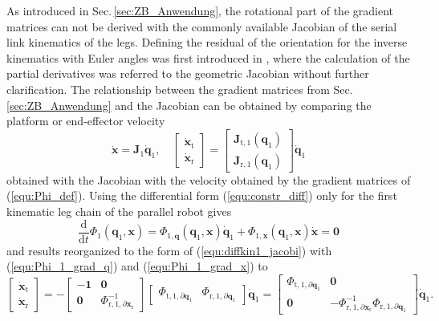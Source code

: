\documentclass[robotics,article,submit,moreauthors,pdftex]{Definitions/mdpi}
\newcommand{\bm}[1]{\boldsymbol{#1}}
\let\Phi\varPhi
\begin{document}
As introduced in Sec.\,\ref{sec:ZB_Anwendung}, the rotational part of the gradient matrices can not be derived with the commonly available Jacobian of the serial link kinematics of the legs.
Defining the residual of the orientation for the inverse kinematics with Euler angles was first introduced in \cite{GoldenbergBenFen1985}, where the calculation of the partial derivatives was referred to the geometric Jacobian without further clarification.
The relationship between the gradient matrices from Sec.\,\ref{sec:ZB_Anwendung} and the Jacobian can be obtained by comparing the platform or end-effector velocity 
%
\begin{equation}
\dot{\bm{x}} = \bm{J}_1 \dot{\bm{q}}_1,
\quad
\begin{bmatrix}
\dot{\bm{x}}_\mathrm{t}\\
\dot{\bm{x}}_\mathrm{r}
\end{bmatrix}
 = 
\begin{bmatrix}
 \bm{J}_{\mathrm{t},1}(\bm{q}_1)\\
 \bm{J}_{\mathrm{r},1}(\bm{q}_1) 
\end{bmatrix}
\dot{\bm{q}}_1
\label{equ:diffkin1_jacobi}
\end{equation}
%
obtained with the Jacobian with the velocity obtained by the gradient matrices of (\ref{equ:Phi_def}).
Using the differential form (\ref{equ:constr_diff}) only for the first kinematic leg chain of the parallel robot gives
%
\begin{equation}
\frac{\mathrm{d}}{\mathrm{d}t} \bm{\Phi}_1(\bm{q}_1,\bm{x})
=
\bm{\Phi}_{1,\bm{q}}(\bm{q}_1,\bm{x}) \dot{\bm{q}}_1 + \bm{\Phi}_{1,\bm{x}}(\bm{q}_1,\bm{x}) \dot{\bm{x}} 
=
\bm{0}
\label{equ:constr_diff1}
\end{equation}
%
and results reorganized to the form of (\ref{equ:diffkin1_jacobi}) with (\ref{equ:Phi_1_grad_q}) and (\ref{equ:Phi_1_grad_x}) to
%
\begin{equation}
\begin{bmatrix}
\dot{\bm{x}}_\mathrm{t}\\
\dot{\bm{x}}_\mathrm{r}
\end{bmatrix}
=
-
\begin{bmatrix}
-\bm{1} & \bm{0} \\
\bm{0} & \bm{\Phi}_{\mathrm{r},1,\partial\bm{x}_\mathrm{r}}^{-1}
\end{bmatrix}
\begin{bmatrix}
\bm{\Phi}_{\mathrm{t},1,\partial\bm{q}_1}
&
\bm{\Phi}_{\mathrm{r},1,\partial\bm{q}_1}
\end{bmatrix}
\dot{\bm{q}}_1
=
\begin{bmatrix}
\bm{\Phi}_{\mathrm{t},1,\partial\bm{q}_1} & \bm{0} \\
\bm{0} & -\bm{\Phi}_{\mathrm{r},1,\partial\bm{x}_\mathrm{r}}^{-1} \bm{\Phi}_{\mathrm{r},1,\partial\bm{q}_1}
\end{bmatrix}
\dot{\bm{q}}_1.
\label{equ:diffkin1_gradmat}
\end{equation}
\end{document}
